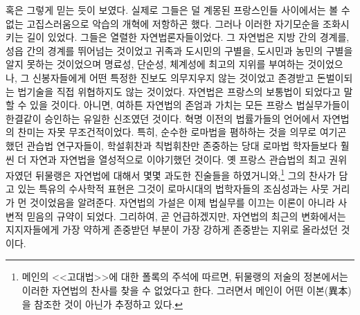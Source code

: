 혹은 그렇게 믿는 듯이 보였다.
실제로 그들은 덜 계몽된 프랑스인들 사이에서는 볼 수 없는 고집스러움으로
악습의 개혁에 저항하곤 했다.
그러나 이러한 자기모순을 조화시키는 길이 있었다.
그들은 열렬한 자연법론자들이었다.
그 자연법은 지방 간의 경계를, 성읍 간의 경계를 뛰어넘는 것이었고
귀족과 도시민의 구별을, 도시민과 농민의 구별을
알지 못하는 것이었으며
명료성, 단순성, 체계성에 최고의 지위를 부여하는 것이었으나,
그 신봉자들에게 어떤 특정한 진보도 의무지우지 않는 것이었고
존경받고 돈벌이되는 법기술을 직접 위협하지도 않는 것이었다.
자연법은 프랑스의 보통법이 되었다고 말할 수 있을 것이다.
아니면, 여하튼 자연법의 존엄과 가치는
모든 프랑스 법실무가들이 한결같이 승인하는 유일한 신조였던 것이다.
혁명 이전의 법률가들의 언어에서 자연법의 찬미는 자못 무조건적이었다.
특히,
순수한 로마법을 폄하하는 것을 의무로 여기곤 했던
관습법 연구자들이,
학설휘찬과 칙법휘찬만 존중하는 당대 로마법 학자들보다
훨씬 더 자연과 자연법을 열성적으로 이야기했던 것이다.
옛 프랑스 관습법의 최고 권위자였던 뒤물랭은
자연법에 대해서 몇몇 과도한 진술들을 하였거니와,\footnote{%
  메인의 <<고대법>>에 대한 폴록의 주석에 따르면,
  뒤물랭의 저술의 정본에서는 이러한 자연법의 찬사를 찾을 수 없었다고 한다.
  그러면서 메인이 어떤 이본(異本)을 참조한 것이 아닌가 추정하고 있다.}
그의 찬사가 담고 있는 특유의 수사학적 표현은
그것이 로마시대의 법학자들의 조심성과는 사뭇 거리가 먼 것이었음을 알려준다.
자연법의 가설은 이제 법실무를 이끄는 이론이 아니라
사변적 믿음의 규약이 되었다.
그리하여, 곧 언급하겠지만, 자연법의 최근의 변화에서는
지지자들에게 가장 약하게 존중받던 부분이 가장 강하게 존중받는 지위로
올라섰던 것이다.

